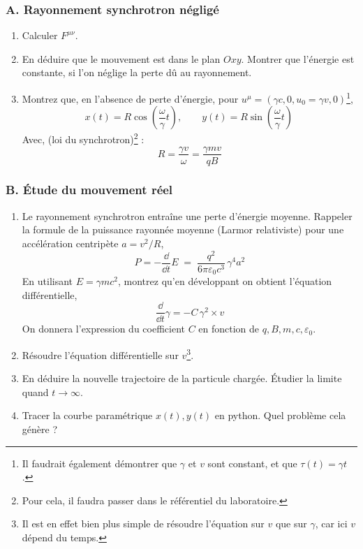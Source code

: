 \documentclass[a4paper,10pt]{report}
\newcommand{\diff}[1]{\frac{\dd}{\dd #1}}
\begin{document}
\subsubsection{A. Rayonnement synchrotron négligé}
\begin{enumerate}
	\item  Calculer $F^{\mu\nu}$.
	
	\item En déduire que le mouvement est dans le plan $Oxy$.
	Montrer que l'énergie est constante, si l'on néglige la perte dû au rayonnement.
	
	\item  Montrez que, en l’absence de perte d’énergie, pour $u^{\mu} = (\gamma c, 0, u_0 = \gamma v, 0)$\footnote{Il faudrait également démontrer que $\gamma$ et $v$ sont constant, et que $\tau(t) = \gamma t$.},
		$$x(t)=R\cos(\frac \omega \gamma t),\qquad y(t)=R\sin(\frac \omega \gamma t)\,$$
	Avec, (loi du synchrotron)\footnote{Pour cela, il faudra passer dans le référentiel du laboratoire.} : 
	$$R = \frac{\gamma v}{\omega} = \frac{\gamma m v}{qB} $$ 
		
	
	
 

\end{enumerate}
	\subsubsection{B. Étude du mouvement réel}
	\begin{enumerate}
	\item Le rayonnement synchrotron entraîne une perte d’énergie moyenne. Rappeler la formule de la puissance rayonnée moyenne (Larmor relativiste) pour une accélération centripète $a = v^2/R$,
	$$P = -\diff t E \;=\; \frac{q^2}{6\pi\varepsilon_0c^3}\,\gamma^4 a^2 $$ 
	En utilisant $E=\gamma mc^2$, montrez qu’en développant on obtient l'équation différentielle,
	 $$\diff t \gamma = -C\,\gamma^2 \times v$$
	 On donnera l’expression du coefficient $C$ en fonction de $q,B,m,c,\varepsilon_0$.
	
	\item  Résoudre l'équation différentielle sur $v$\footnote{Il est en effet bien plus simple de résoudre l'équation sur $v$ que sur $\gamma$, car ici $v$ dépend du temps.}.
	
	\item  En déduire la nouvelle trajectoire de la particule chargée. Étudier la limite quand $t \to \infty$.
	
	\item Tracer la courbe paramétrique $x(t), y(t)$ en python. Quel problème cela génère ?
	
\end{enumerate}
\end{document}
